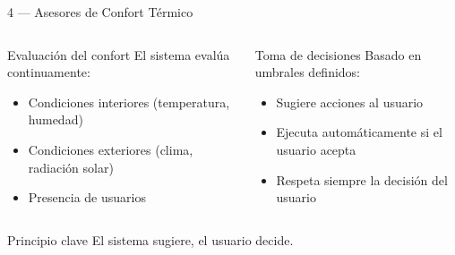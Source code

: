 \begin{frame}{4 — Asesores de Confort Térmico}
  \hypertarget{s:confort}{}
  \begin{columns}[T]
    \begin{block}{Evaluación del confort}
      \footnotesize
      El sistema evalúa continuamente:
      \begin{itemize}
        \item Condiciones interiores (temperatura, humedad)
        \item Condiciones exteriores (clima, radiación solar)
        \item Presencia de usuarios
      \end{itemize}
    \end{block}

    \begin{exampleblock}{Toma de decisiones}
      \footnotesize
      Basado en umbrales definidos:
      \begin{itemize}
        \item Sugiere acciones al usuario
        \item Ejecuta automáticamente si el usuario acepta
        \item Respeta siempre la decisión del usuario
      \end{itemize}
    \end{exampleblock}
  \end{columns}

  \vspace{0.5cm}
  \begin{alertblock}{Principio clave}
    \centering\footnotesize
    El sistema sugiere, el usuario decide.
  \end{alertblock}
\end{frame}



